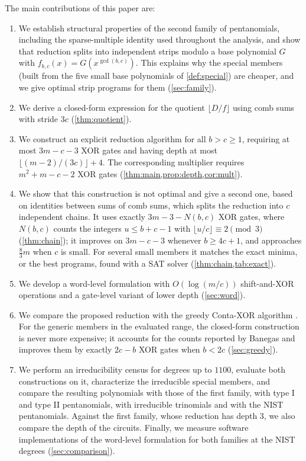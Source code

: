 \documentclass{ieeeaccess}
\theoremstyle{plain}
\theoremstyle{definition}
\begin{document}
The main contributions of this paper are:
\begin{enumerate}[leftmargin=*,itemsep=2pt]

\item We establish structural properties of the second
family of pentanomials, including the sparse-multiple identity used throughout
the analysis, and show that reduction splits into independent strips modulo a
base polynomial $G$ with $f_{b,c}(x)=G(x^{\gcd(b,c)})$. This explains why the
special members (built from the five small base polynomials of \cref{def:special}) are
cheaper, and we give optimal strip programs for them (\cref{sec:family}).

\item We derive a closed-form expression for the quotient
$\lfloor D/f\rfloor$ using comb sums with stride $3c$ (\cref{thm:quotient}).

\item We construct an explicit reduction algorithm for
all $b>c\ge1$, requiring at most $3m-c-3$ XOR gates and having depth at most
$\lfloor(m-2)/(3c)\rfloor+4$. The corresponding multiplier requires $m^2+m-c-2$
XOR gates (\cref{thm:main,prop:depth,cor:mult}).

\item We show that this construction is not optimal and give a second one, based
on identities between sums of comb sums, which splits the reduction into $c$
independent chains. It uses exactly $3m-3-N(b,c)$ XOR gates, where $N(b,c)$ counts the integers
$u\le b+c-1$ with $\lfloor u/c\rfloor\equiv2\pmod 3$ (\cref{thm:chain}); it improves on
$3m-c-3$ whenever $b\ge4c+1$, and approaches $\tfrac83m$ when $c$ is small. For
several small members it matches the exact minima, or the best programs, found
with a SAT solver (\cref{thm:chain,tab:exact}).

\item We develop a word-level formulation with $O(\log(m/c))$ shift-and-XOR
operations and a gate-level variant of lower depth (\cref{sec:word}).

\item We compare the proposed reduction with the
greedy Conta-XOR algorithm \cite{Banegas2015}. For the generic members in the evaluated range, the
closed-form construction is never more expensive; it accounts for the counts
reported by Banegas and improves them by exactly $2c-b$ XOR gates when $b<2c$
(\cref{sec:greedy}).

\item We perform an irreducibility census for degrees
up to $1100$, evaluate both constructions on it, characterize the irreducible
special members, and compare the resulting polynomials with those of the first
family, with type I and type II pentanomials, with irreducible trinomials and
with the NIST pentanomials. Against the first family, whose reduction has
depth $3$, we also compare the depth of the circuits. Finally, we measure
software implementations of the word-level formulation for both families at
the NIST degrees (\cref{sec:comparison}).

\end{enumerate}
\end{document}
